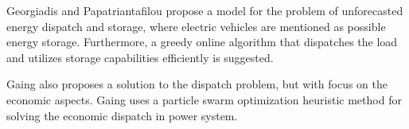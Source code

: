Georgiadis and Papatriantafilou \cite{georgiadis2013greedy} propose a model for the problem of unforecasted energy dispatch and storage, where electric vehicles are mentioned as possible energy storage. Furthermore, a greedy online algorithm that dispatches the load and utilizes storage capabilities efficiently is suggested. 

Gaing \cite{gaing} also proposes a solution to the dispatch problem, but with focus on the economic aspects. Gaing uses a particle swarm optimization heuristic method for solving the economic dispatch in power system.
